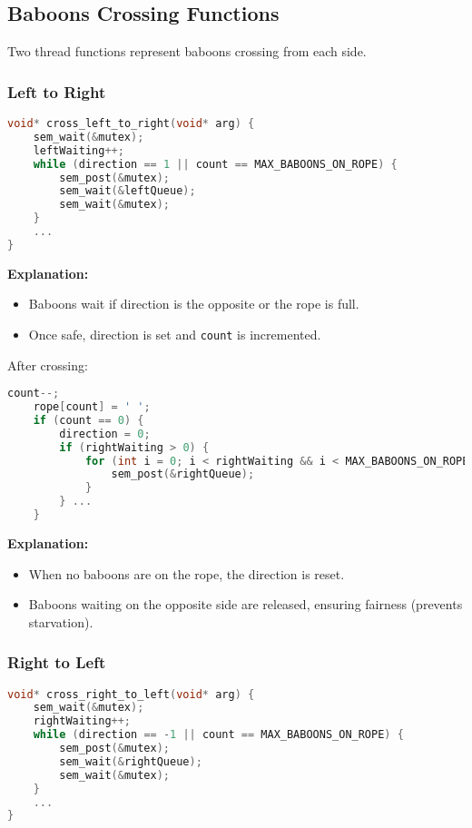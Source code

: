 \documentclass{article}
\begin{document}
\subsection*{Baboons Crossing Functions}

Two thread functions represent baboons crossing from each side.

\subsubsection*{Left to Right}

\begin{lstlisting}[language=C]
void* cross_left_to_right(void* arg) {
    sem_wait(&mutex);
    leftWaiting++;
    while (direction == 1 || count == MAX_BABOONS_ON_ROPE) {
        sem_post(&mutex);
        sem_wait(&leftQueue);
        sem_wait(&mutex);
    }
    ...
}
\end{lstlisting}

\textbf{Explanation:}
\begin{itemize}
    \item Baboons wait if direction is the opposite or the rope is full.
    \item Once safe, direction is set and \texttt{count} is incremented.
\end{itemize}

After crossing:

\begin{lstlisting}[language=C]
    count--;
    rope[count] = ' ';
    if (count == 0) {
        direction = 0;
        if (rightWaiting > 0) {
            for (int i = 0; i < rightWaiting && i < MAX_BABOONS_ON_ROPE; i++) {
                sem_post(&rightQueue);
            }
        } ...
    }
\end{lstlisting}

\textbf{Explanation:}
\begin{itemize}
    \item When no baboons are on the rope, the direction is reset.
    \item Baboons waiting on the opposite side are released, ensuring fairness (prevents starvation).
\end{itemize}

\subsubsection*{Right to Left}

\begin{lstlisting}[language=C]
void* cross_right_to_left(void* arg) {
    sem_wait(&mutex);
    rightWaiting++;
    while (direction == -1 || count == MAX_BABOONS_ON_ROPE) {
        sem_post(&mutex);
        sem_wait(&rightQueue);
        sem_wait(&mutex);
    }
    ...
}
\end{lstlisting}
\end{document}
